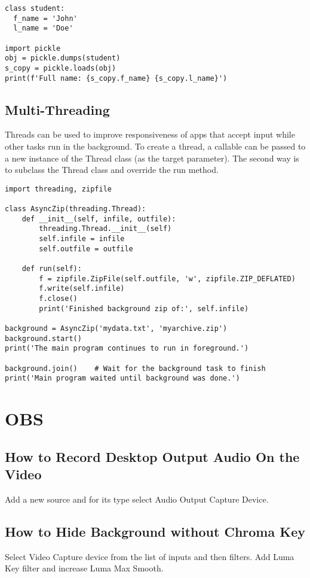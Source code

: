 \documentclass{article}
\begin{document}
\begin{verbatim}
class student:
  f_name = 'John'
  l_name = 'Doe'
 
import pickle
obj = pickle.dumps(student)
s_copy = pickle.loads(obj)
print(f'Full name: {s_copy.f_name} {s_copy.l_name}')
\end{verbatim}

\subsection{Multi-Threading}

Threads can be used to improve responsiveness of apps that accept input while other tasks run in the background. 
To create a thread, a callable can be passed to a new instance of the Thread class (as the target parameter). The second way is to subclass the Thread class  and override the run method. 

\begin{lstlisting}
import threading, zipfile

class AsyncZip(threading.Thread):
    def __init__(self, infile, outfile):
        threading.Thread.__init__(self)
        self.infile = infile
        self.outfile = outfile

    def run(self):
        f = zipfile.ZipFile(self.outfile, 'w', zipfile.ZIP_DEFLATED)
        f.write(self.infile)
        f.close()
        print('Finished background zip of:', self.infile)

background = AsyncZip('mydata.txt', 'myarchive.zip')
background.start()
print('The main program continues to run in foreground.')

background.join()    # Wait for the background task to finish
print('Main program waited until background was done.')
\end{lstlisting}




\section{OBS}
\subsection{How to Record Desktop Output Audio On the Video}
Add a new source and for its type select Audio Output Capture Device. 

\subsection{How to Hide Background without Chroma Key}
Select Video Capture device from the list of inputs and then filters. Add Luma Key filter and increase Luma Max Smooth.
\end{document}
